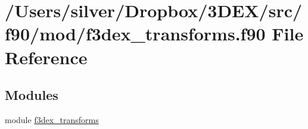\hypertarget{f3dex__transforms_8f90}{
\section{/Users/silver/Dropbox/3DEX/src/f90/mod/f3dex\_\-transforms.f90 File Reference}
\label{f3dex__transforms_8f90}
}
\subsection*{Modules}
\begin{DoxyCompactItemize}
\item 
module \hyperlink{namespacef3dex__transforms}{f3dex\_\-transforms}
\end{DoxyCompactItemize}
